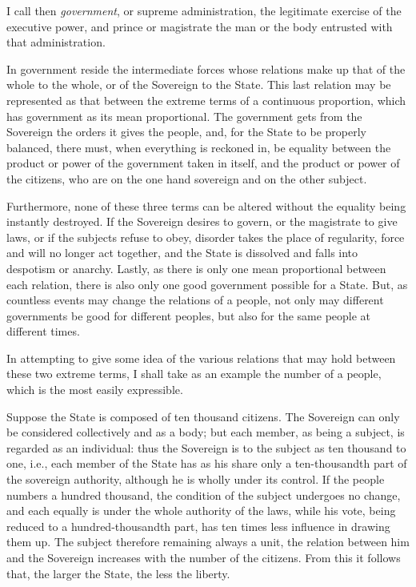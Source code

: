 \documentclass[12pt]{book}
\begin{document}
I call then \textit{government}, or supreme administration, the legitimate exercise of the executive power, and prince or magistrate the man or the body entrusted with that administration.

In government reside the intermediate forces whose relations make up that of the whole to the whole, or of the Sovereign to the State. This last relation may be represented as that between the extreme terms of a continuous proportion, which has government as its mean proportional. The government gets from the Sovereign the orders it gives the people, and, for the State to be properly balanced, there must, when everything is reckoned in, be equality between the product or power of the government taken in itself, and the product or power of the citizens, who are on the one hand sovereign and on the other subject.

Furthermore, none of these three terms can be altered without the equality being instantly destroyed. If the Sovereign desires to govern, or the magistrate to give laws, or if the subjects refuse to obey, disorder takes the place of regularity, force and will no longer act together, and the State is dissolved and falls into despotism or anarchy. Lastly, as there is only one mean proportional between each relation, there is also only one good government possible for a State. But, as countless events may change the relations of a people, not only may different governments be good for different peoples, but also for the same people at different times.

In attempting to give some idea of the various relations that may hold between these two extreme terms, I shall take as an example the number of a people, which is the most easily expressible.

Suppose the State is composed of ten thousand citizens. The Sovereign can only be considered collectively and as a body; but each member, as being a subject, is regarded as an individual: thus the Sovereign is to the subject as ten thousand to one, i.e., each member of the State has as his share only a ten-thousandth part of the sovereign authority, although he is wholly under its control. If the people numbers a hundred thousand, the condition of the subject undergoes no change, and each equally is under the whole authority of the laws, while his vote, being reduced to a hundred-thousandth part, has ten times less influence in drawing them up. The subject therefore remaining always a unit, the relation between him and the Sovereign increases with the number of the citizens. From this it follows that, the larger the State, the less the liberty.
\end{document}
